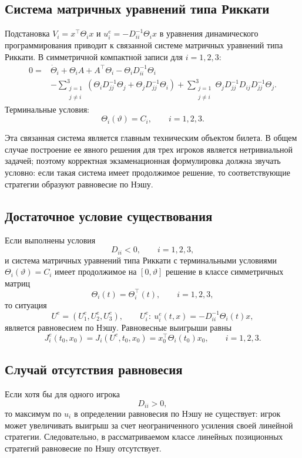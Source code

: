\documentclass[12pt,a4paper]{article}
\begin{document}
\subsection*{Система матричных уравнений типа Риккати}
Подстановка \(V_i=x^{\top}\Theta_i x\) и \(u_i^e=-D_{ii}^{-1}\Theta_i x\) в уравнения динамического программирования приводит к связанной системе матричных уравнений типа Риккати. В симметричной компактной записи для \(i=1,2,3\):
\[
\begin{aligned}
0={}&\dot\Theta_i+\Theta_iA+A^{\top}\Theta_i-\Theta_iD_{ii}^{-1}\Theta_i \\
&-\sum_{\substack{j=1\\ j\ne i}}^3
\left(\Theta_iD_{jj}^{-1}\Theta_j+\Theta_jD_{jj}^{-1}\Theta_i\right)
+\sum_{\substack{j=1\\ j\ne i}}^3
\Theta_jD_{jj}^{-1}D_{ij}D_{jj}^{-1}\Theta_j .
\end{aligned}
\]
Терминальные условия:
\[
\Theta_i(\vartheta)=C_i,\qquad i=1,2,3.
\]

Эта связанная система является главным техническим объектом билета. В общем случае построение ее явного решения для трех игроков является нетривиальной задачей; поэтому корректная экзаменационная формулировка должна звучать условно: если такая система имеет продолжимое решение, то соответствующие стратегии образуют равновесие по Нэшу.

\subsection*{Достаточное условие существования}
Если выполнены условия
\[
D_{ii}<0,
\qquad i=1,2,3,
\]
и система матричных уравнений типа Риккати с терминальными условиями \(\Theta_i(\vartheta)=C_i\) имеет продолжимое на \([0,\vartheta]\) решение в классе симметричных матриц
\[
\Theta_i(t)=\Theta_i^{\top}(t),
\qquad i=1,2,3,
\]
то ситуация
\[
U^e=(U_1^e,U_2^e,U_3^e),
\qquad
U_i^e:\ u_i^e(t,x)=-D_{ii}^{-1}\Theta_i(t)x,
\]
является равновесием по Нэшу. Равновесные выигрыши равны
\[
J_i^e(t_0,x_0)=J_i(U^e,t_0,x_0)=x_0^{\top}\Theta_i(t_0)x_0,
\qquad i=1,2,3.
\]

\subsection*{Случай отсутствия равновесия}
Если хотя бы для одного игрока
\[
D_{ii}>0,
\]
то максимум по \(u_i\) в определении равновесия по Нэшу не существует: игрок может увеличивать выигрыш за счет неограниченного усиления своей линейной стратегии. Следовательно, в рассматриваемом классе линейных позиционных стратегий равновесие по Нэшу отсутствует.
\end{document}
